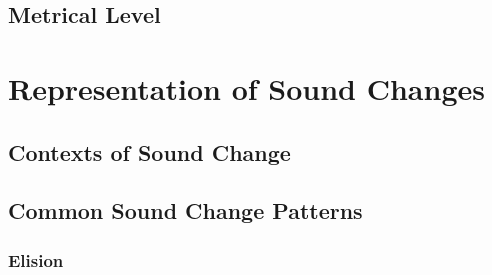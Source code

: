 \documentclass{report}[12pt]
\begin{document}
\subsection{Metrical Level}

\section{Representation of Sound Changes}

\subsection{Contexts of Sound Change}

\subsection{Common Sound Change Patterns}

\subsubsection{Elision}\label{sec:elision_lam}
\end{document}
